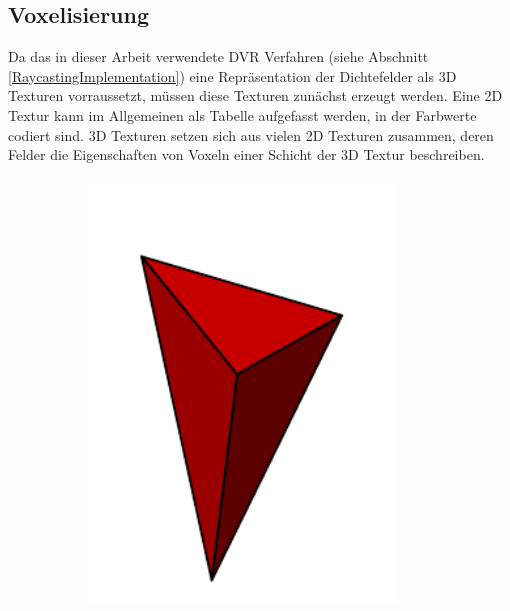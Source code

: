 \documentclass[a4paper,fontsize=12pt,toc=bib,halfparskip]{scrartcl}
\begin{document}
\subsection{Voxelisierung}

Da das in dieser Arbeit verwendete DVR Verfahren (siehe Abschnitt \ref{RaycastingImplementation}) eine Repr\"asentation der Dichtefelder als 3D Texturen vorraussetzt, m\"ussen diese Texturen zun\"achst erzeugt werden. Eine 2D Textur kann im Allgemeinen als Tabelle aufgefasst werden, in der Farbwerte codiert sind. 3D Texturen setzen sich aus vielen 2D Texturen zusammen, deren Felder die Eigenschaften von Voxeln einer Schicht der 3D Textur beschreiben. 

\begin{figure}
	\centering
	\hspace{0.5cm}
	\begin{subfigure}{0.2\textwidth}
		\includegraphics[width=0.9\textwidth]{pictures/TetraCuts1}
		\caption{}
	\end{subfigure}
	\hspace{1cm}
	\begin{subfigure}{0.2\textwidth}

\end{subfigure}
\end{figure}
\end{document}
